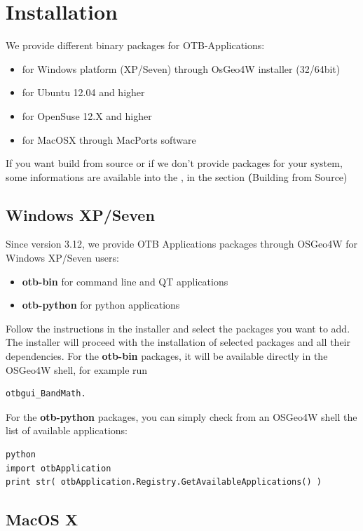 \section{Installation}\label{sec:appinstall}

We provide different binary packages for OTB-Applications:
\begin{itemize}
\item for Windows platform (XP/Seven) through OsGeo4W installer (32/64bit)
\item for Ubuntu 12.04 and higher
\item for OpenSuse 12.X and higher
\item for MacOSX through MacPorts software  
\end{itemize}

If you want build from source or if we don't provide packages for your system, some informations are available into the \sg, in the section \textbf(Building from Source)

\subsection{Windows XP/Seven}

Since version 3.12, we provide OTB Applications packages through OSGeo4W for Windows XP/Seven users:
\begin{itemize}
\item \textbf{otb-bin} for command line and QT applications
\item \textbf{otb-python} for python applications
\end{itemize}
Follow the instructions in the installer and select the packages you want to add. The installer will proceed with the installation of selected packages and all their dependencies.
For the \textbf{otb-bin} packages, it will be available directly in the OSGeo4W shell, for example run
\begin{verbatim}
otbgui_BandMath.
\end{verbatim}
For the \textbf{otb-python} packages, you can simply check from an OSGeo4W shell the list of available applications:
\begin{verbatim}
python
import otbApplication
print str( otbApplication.Registry.GetAvailableApplications() )
\end{verbatim}

\subsection{MacOS X}

